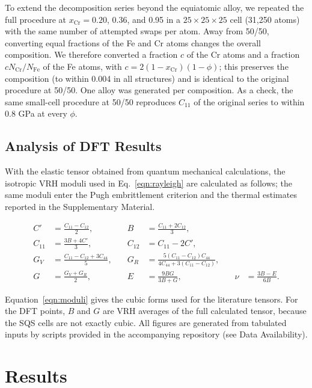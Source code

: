 \documentclass[final,3p,times]{elsarticle}
\begin{document}
To extend the decomposition series beyond the equiatomic alloy, we repeated the full procedure at $x_{\mathrm{Cr}}=0.20$, 0.36, and 0.95 in a $25\times25\times25$ cell (31,250 atoms) with the same number of attempted swaps per atom. Away from 50/50, converting equal fractions of the Fe and Cr atoms changes the overall composition. We therefore converted a fraction $c$ of the Cr atoms and a fraction $cN_{\mathrm{Cr}}/N_{\mathrm{Fe}}$ of the Fe atoms, with $c=2(1-x_{\mathrm{Cr}})(1-\phi)$; this preserves the composition (to within 0.004 in all structures) and is identical to the original procedure at 50/50. One alloy was generated per composition. As a check, the same small-cell procedure at 50/50 reproduces $C_{11}$ of the original series to within 0.8 GPa at every $\phi$.

\subsection{Analysis of DFT Results}
\label{sec:analysis}
With the elastic tensor obtained from quantum mechanical calculations, the isotropic VRH moduli used in Eq.~\ref{eqn:rayleigh} are calculated as follows; the same moduli enter the Pugh embrittlement criterion and the thermal estimates reported in the Supplementary Material.

\begin{equation}
\begin{aligned}
C' &= \frac{C_{11}-C_{12}}{2},
&\quad
B &= \frac{C_{11}+2C_{12}}{3}, \\
C_{11} &= \frac{3B+4C'}{3},
&\quad
C_{12} &= C_{11}-2C', \\
G_V &= \frac{C_{11}-C_{12}+3C_{44}}{5},
&\quad
G_R &= \frac{5(C_{11}-C_{12})C_{44}}{4C_{44}+3(C_{11}-C_{12})}, \\
G &= \frac{G_V+G_R}{2},
&\quad
E &= \frac{9BG}{3B+G},
&\quad
\nu &= \frac{3B-E}{6B}.
\end{aligned}
\label{eqn:moduli}
\end{equation}

Equation~\ref{eqn:moduli} gives the cubic forms used for the literature tensors. For the DFT points, $B$ and $G$ are VRH averages of the full calculated tensor, because the SQS cells are not exactly cubic. All figures are generated from tabulated inputs by scripts provided in the accompanying repository (see Data Availability).


\section{Results}
\end{document}

